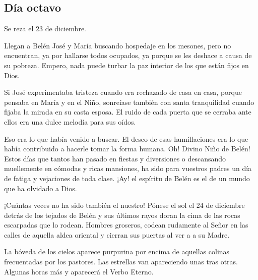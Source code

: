\documentclass[spanish,utf8,twocolumn]{chlart}
\newenvironment{summary}{\begingroup
	\small\sffamily\itshape%
	\setlength{\leftskip}{3em}\setlength{\rightskip}{3em}\noindent
	}{\par\endgroup}
\newenvironment{lectura}{\begingroup\color{lector}}{\endgroup\par}
\begin{document}
\subsection*{Día octavo}
\begin{summary}
Se reza el 23 de diciembre.
\end{summary}
\begin{lectura}
Llegan a Belén José y María buscando hospedaje en los mesones, pero no
encuentran, ya por hallarse todos ocupados, ya porque se les deshace a
causa de su pobreza.
Empero, nada puede turbar la paz interior de los que están fijos en
Dios.

Si José experimentaba tristeza cuando era rechazado de casa en casa,
porque pensaba en María y en el Niño, sonreíase también con santa
tranquilidad cuando fijaba la mirada en su casta esposa.
El ruido de cada puerta que se cerraba ante ellos era una dulce melodía
para sus oídos.

Eso era lo que había venido a buscar.
El deseo de esas humillaciones era lo que había contribuido a hacerle
tomar la forma humana.
Oh!
Divino Niño de Belén!
Estos días que tantos han pasado en fiestas y diversiones o descansando
muellemente en cómodas y ricas mansiones, ha sido para vuestros padres
un día de fatiga y vejaciones de toda clase.
¡Ay!
el espíritu de Belén es el de un mundo que ha olvidado a Dios.

¡Cuántas veces no ha sido también el nuestro!
Pónese el sol el 24 de diciembre detrás de los tejados de Belén y sus
últimos rayos doran la cima de las rocas escarpadas que lo rodean.
Hombres groseros, codean rudamente al Señor en las calles de aquella
aldea oriental y cierran sus puertas al ver a a su Madre.

La bóveda de los cielos aparece purpurina por encima de aquellas colinas
frecuentadas por los pastores.
Las estrellas van apareciendo unas tras otras.
Algunas horas más y aparecerá el Verbo Eterno.
\end{lectura}
\end{document}
